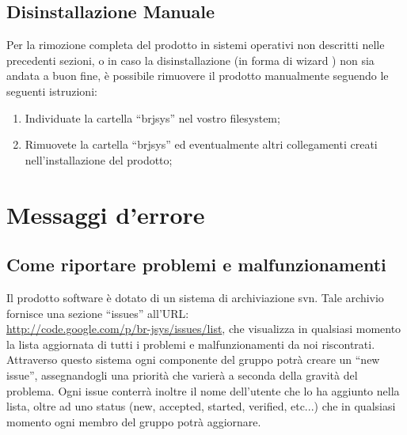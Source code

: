 \section{Disinstallazione Manuale}
Per la rimozione completa del prodotto in sistemi operativi non descritti nelle precedenti sezioni, o in caso la disinstallazione (in forma di wizard ) non sia andata a buon fine, \`e possibile rimuovere il prodotto manualmente seguendo le seguenti istruzioni:
\begin{enumerate}
\item Individuate la cartella ``brjsys'' nel vostro filesystem;
\item Rimuovete la cartella ``brjsys'' ed eventualmente altri collegamenti creati nell'installazione del prodotto;
\end{enumerate}

\chapter{Messaggi d'errore}
\section{Come riportare problemi e malfunzionamenti}
Il prodotto software \`e dotato di un sistema di archiviazione svn. Tale archivio fornisce una sezione ``issues'' all'URL: \\ 
\href{http://code.google.com/p/br-jsys/issues/list}{http://code.google.com/p/br-jsys/issues/list}, che visualizza in qualsiasi momento la lista aggiornata di tutti i problemi e malfunzionamenti da noi riscontrati. Attraverso questo sistema ogni componente del gruppo potr\`a creare un ``new issue'', assegnandogli una priorit\`a che varier\`a a seconda della gravit\`a del problema. Ogni issue conterr\`a inoltre il nome dell'utente che lo ha aggiunto nella lista, oltre ad uno status (new, accepted, started, verified, etc...) che in qualsiasi momento ogni membro del gruppo potr\`a aggiornare. 

\newpage
